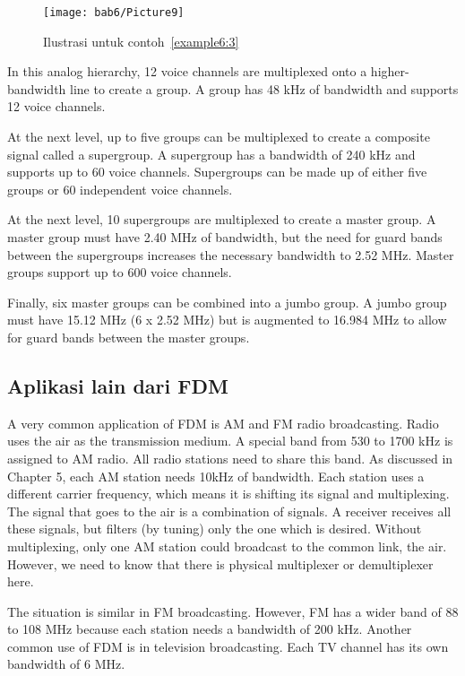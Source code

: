 \begin{figure}[htbp]
  \centering
  \texttt{[image: bab6/Picture9]}
  \caption{Ilustrasi untuk contoh~\ref{example6:3}}
  \label{fig6:8}
\end{figure}

In this analog hierarchy, 12 voice channels are multiplexed onto a higher-bandwidth line to create a group. A group has 48 kHz of bandwidth and supports 12 voice channels.

At the next level, up to five groups can be multiplexed to create a composite signal called a supergroup. A supergroup has a bandwidth of 240 kHz and supports up to 60 voice channels. Supergroups can be made up of either five groups or 60 independent voice channels.

At the next level, 10 supergroups are multiplexed to create a master group. A master group must have 2.40 MHz of bandwidth, but the need for guard bands between the supergroups increases the necessary bandwidth to 2.52 MHz. Master groups support up to 600 voice channels.

Finally, six master groups can be combined into a jumbo group. A jumbo group must have 15.12 MHz (6 x 2.52 MHz) but is augmented to 16.984 MHz to allow for guard bands between the master groups.

\subsection*{Aplikasi lain dari FDM}
A very common application of FDM is AM and FM radio broadcasting. Radio uses the air as the transmission medium. A special band from 530 to 1700 kHz is assigned to AM radio. All radio stations need to share this band. As discussed in Chapter 5, each AM station needs 10kHz of bandwidth. Each station uses a different carrier frequency, which means it is shifting its signal and multiplexing. The signal that goes to the air is a combination of signals. A receiver receives all these signals, but filters (by tuning) only the one which is desired. Without multiplexing, only one AM station could broadcast to the common link, the air. However, we need to know that there is physical multiplexer or demultiplexer here.

The situation is similar in FM broadcasting. However, FM has a wider band of 88 to 108 MHz because each station needs a bandwidth of 200 kHz. Another common use of FDM is in television broadcasting. Each TV channel has its own bandwidth of 6 MHz.

